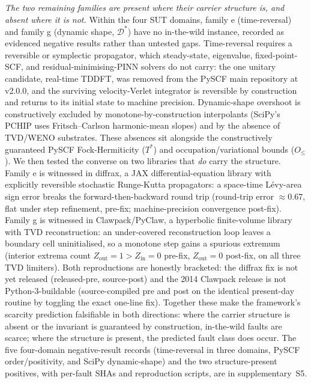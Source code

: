 \documentclass[acmsmall,screen,review]{acmart}
\begin{document}
\emph{The two remaining families are present where their carrier structure is, and absent where it is not.} Within the four SUT domains, family e (time-reversal) and family g (dynamic shape, $\mathcal{D}^{*}$) have no in-the-wild instance, recorded as evidenced negative results rather than untested gaps. Time-reversal requires a reversible or symplectic propagator, which steady-state, eigenvalue, fixed-point-SCF, and residual-minimising-PINN solvers do not carry: the one unitary candidate, real-time TDDFT, was removed from the PySCF main repository at v2.0.0, and the surviving velocity-Verlet integrator is reversible by construction and returns to its initial state to machine precision. Dynamic-shape overshoot is constructively excluded by monotone-by-construction interpolants (SciPy's PCHIP uses Fritsch--Carlson harmonic-mean slopes) and by the absence of TVD/WENO substrates. These absences sit alongside the constructively guaranteed PySCF Fock-Hermiticity ($T^{*}$) and occupation/variational bounds ($O_{\le}$). We then tested the converse on two libraries that \emph{do} carry the structure. Family e is witnessed in diffrax, a JAX differential-equation library with explicitly reversible stochastic Runge-Kutta propagators: a space-time L\'evy-area sign error breaks the forward-then-backward round trip (round-trip error $\approx 0.67$, flat under step refinement, pre-fix; machine-precision convergence post-fix). Family g is witnessed in Clawpack/PyClaw, a hyperbolic finite-volume library with TVD reconstruction: an under-covered reconstruction loop leaves a boundary cell uninitialised, so a monotone step gains a spurious extremum (interior extrema count $Z_{\mathrm{out}}=1>Z_{\mathrm{in}}=0$ pre-fix, $Z_{\mathrm{out}}=0$ post-fix, on all three TVD limiters). Both reproductions are honestly bracketed: the diffrax fix is not yet released (released-pre, source-post) and the 2014 Clawpack release is not Python-3-buildable (source-compiled pre and post on the identical present-day routine by toggling the exact one-line fix). Together these make the framework's scarcity prediction falsifiable in both directions: where the carrier structure is absent or the invariant is guaranteed by construction, in-the-wild faults are scarce; where the structure is present, the predicted fault class does occur. The five four-domain negative-result records (time-reversal in three domains, PySCF order/positivity, and SciPy dynamic-shape) and the two structure-present positives, with per-fault SHAs and reproduction scripts, are in supplementary~S5.
\end{document}
